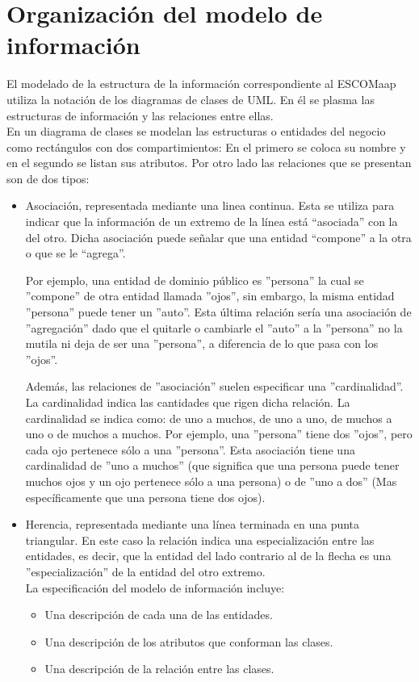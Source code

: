 \section{Organización del modelo de información}

El modelado de la estructura de la información correspondiente al ESCOMaap utiliza la notación de los diagramas de clases de UML. En él se plasma las estructuras de información y las relaciones entre ellas.\\

En un diagrama de clases se modelan las estructuras o entidades del negocio como rectángulos con dos compartimientos: En el primero se coloca su nombre y en el segundo se listan sus atributos. Por otro lado las relaciones que se presentan son de dos tipos:

\begin{itemize}
	\item Asociación, representada mediante una linea continua. Esta se utiliza para indicar que la información de un extremo de la línea está “asociada” con la del otro. Dicha asociación puede señalar que una entidad “compone” a la otra o que se le “agrega”.
	
	Por ejemplo, una entidad de dominio público es ''persona'' la cual se ''compone'' de otra entidad llamada ''ojos'', sin embargo, la misma entidad ''persona'' puede tener un ''auto''. Esta última relación sería una asociación de ''agregación'' dado que el quitarle o cambiarle el ''auto'' a la ''persona'' no la mutila ni deja de ser una ''persona'', a diferencia de lo que pasa con los ''ojos''.
	
	Además, las relaciones de ''asociación'' suelen especificar una ''cardinalidad''. La cardinalidad indica las cantidades que rigen dicha relación. La cardinalidad se indica como: de uno a muchos, de uno a uno, de muchos a uno o de muchos a muchos. Por ejemplo, una ''persona'' tiene dos ''ojos'', pero cada ojo pertenece sólo a una ''persona''. Esta asociación tiene una cardinalidad de ''uno a muchos'' (que significa que una persona puede tener muchos ojos y un ojo pertenece sólo a una persona) o de ''uno a dos'' (Mas específicamente que una persona tiene dos ojos).
	
	\item Herencia, representada mediante una línea terminada en una punta triangular. En este caso la relación indica una especialización entre las entidades, es decir, que la entidad del lado contrario al de la flecha es una ''especialización'' de la entidad del otro extremo. \\
	
	La especificación del modelo de información incluye:
	\begin{itemize}
		\item Una descripción de cada una de las entidades.
		\item Una descripción de los atributos que conforman las clases.
		\item Una descripción de la relación entre las clases.
	\end{itemize}
\end{itemize}
